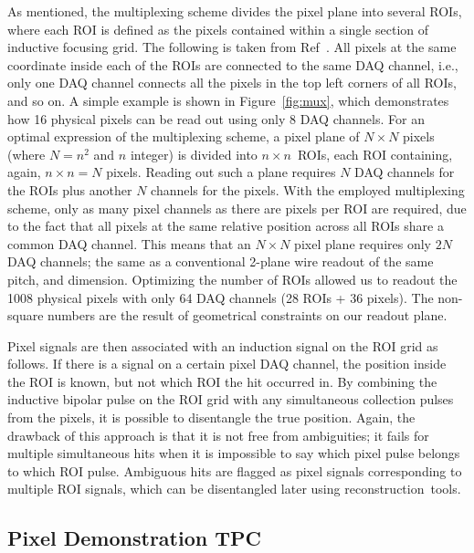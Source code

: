 \documentclass[instruments,article,accept,moreauthors,pdftex]{Definitions/mdpi}
\begin{document}
As mentioned, the multiplexing scheme divides the pixel plane into several ROIs, where each ROI is defined as the pixels contained within a single section of inductive focusing grid. 
The following is taken from Ref~\cite{maplesyrup}.
All pixels at the same coordinate inside each of the ROIs are connected to the same DAQ channel, i.e., only one DAQ channel connects all the pixels in the top left corners of all ROIs, and so on.
A simple example is shown in Figure~\ref{fig:mux}, which demonstrates how 16 physical pixels can be read out using only 8 DAQ channels. 
For an optimal expression of the multiplexing scheme, a pixel plane of $N \times N$ pixels (where $N = n ^ 2$ and $n$ integer) is divided into $n \times n$~ROIs, each ROI containing, again, $n \times n = N$ pixels.
Reading out such a plane requires $N$ DAQ channels for the ROIs plus another $N$ channels for the pixels.
With the employed multiplexing scheme, only as many pixel channels as there are pixels per ROI are required, due to the fact that all pixels at the same relative position across all ROIs share a common DAQ channel.
This means that an $N \times N$ pixel plane requires only $2 N$ DAQ channels; the same as a conventional 2-plane wire readout of the same pitch, and dimension.
Optimizing the number of ROIs allowed us to readout the 1008 physical pixels with only 64 DAQ channels (28 ROIs + 36 pixels).
The non-square numbers are the result of geometrical constraints on our readout plane.



Pixel signals are then associated with an induction signal on the ROI grid as follows. 
If there is a signal on a certain pixel DAQ channel, the position inside the ROI is known, but not which ROI the hit occurred in.
By combining the inductive bipolar pulse on the ROI grid with any simultaneous collection pulses from the pixels, it is possible to disentangle the true position.
Again, the drawback of this approach is that it is not free from ambiguities; it fails for multiple simultaneous hits when it is impossible to say which pixel pulse belongs to which ROI pulse.
Ambiguous hits are flagged as pixel signals corresponding to multiple ROI signals, which can be disentangled later using reconstruction~tools. 



\subsection{Pixel Demonstration TPC} \label{sec:viper}
\end{document}
